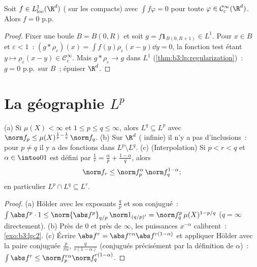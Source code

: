 \begin{corollary}\label{cor:b3:lp:fundlemma}
Soit $f \in L^1_{\mathrm{loc}}(\R^d)$ ( sur les
compacts) avec $\int f\varphi = 0$ pour toute $\varphi \in
\mathcal C^\infty_c(\R^d)$. Alors $f = 0$
p.p.
\end{corollary}

\begin{proof}
Fixer une boule $B = B(0, R)$ et soit $g = f\mathbf 1_{B(0,
R+1)} \in L^1$. Pour $x \in B$ et $\varepsilon < 1$~: $(g *
\rho_\varepsilon)(x) = \int f(y)\rho_\varepsilon(x - y)\dd y =
0$, la fonction test étant $y \mapsto \rho_\varepsilon(x-y)
\in \mathcal C_c^\infty$. Mais $g * \rho_\varepsilon \to g$
dans $L^1$ (\cref{thm:b3:lp:regularization})~: $g = 0$ p.p.\
sur $B$~; épuiser $\R^d$.
\end{proof}

\section{La géographie \texorpdfstring{$L^p$}{Lp}}

\begin{proposition}\label{prop:b3:lp:inclusions}
(a) Si $\mu(X) < \infty$ et $1 \leq p \leq q \leq \infty$,
alors $L^q \subseteq L^p$ avec $\norm f_p \leq
\mu(X)^{\frac1p - \frac1q}\,\norm f_q$.
(b) Sur $\R^d$ ( infinie) il n'y a pas d'inclusions~:
pour $p \neq q$ il y a des fonctions dans $L^p\setminus L^q$.
(c) (Interpolation) Si $p < r < q$ et $\alpha \in \intoo01$
est défini par $\frac1r = \frac\alpha p + \frac{1 - \alpha}q$,
alors
\[
\norm f_r \leq \norm f_p^{\alpha}\,\norm f_q^{1 - \alpha} ;
\]
en particulier $L^p \cap L^q \subseteq L^r$.
\end{proposition}

\begin{proof}
(a) Hölder avec les exposants $\frac qp$ et son conjugué~:
$\int\abs f^p\cdot 1 \leq \norm{\abs f^p}_{q/p}\,\norm
1_{(q/p)'} = \norm f_q^p\,\mu(X)^{1 - p/q}$ ($q = \infty$
directement). (b) Près de $0$ et près de $\infty$, les
puissances $x^{-\alpha}$ calibrent~: \cref{exo:b3:lp:2}. (c)
Écrire $\abs f^r = \abs f^{r\alpha}\abs f^{r(1-\alpha)}$ et
appliquer Hölder avec la paire conjuguée $\frac p{r\alpha}$,
$\frac q{r(1-\alpha)}$ (conjugués précisément par la
définition de $\alpha$)~: $\int\abs f^r \leq
\norm f_p^{r\alpha}\norm f_q^{r(1 - \alpha)}$.
\end{proof}


